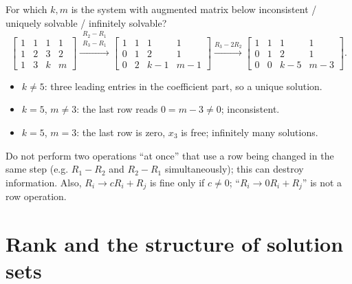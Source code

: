 \begin{example}
For which $k,m$ is the system with augmented matrix below inconsistent / uniquely solvable /
infinitely solvable?
\[
\left[\begin{array}{ccc|c} 1&1&1&1\\ 1&2&3&2\\ 1&3&k&m\end{array}\right]
\xrightarrow{\substack{R_2-R_1\\R_3-R_1}}
\left[\begin{array}{ccc|c} 1&1&1&1\\ 0&1&2&1\\ 0&2&k-1&m-1\end{array}\right]
\xrightarrow{R_3-2R_2}
\left[\begin{array}{ccc|c} 1&1&1&1\\ 0&1&2&1\\ 0&0&k-5&m-3\end{array}\right].
\]
\begin{itemize}
  \item $k\ne5$: three leading entries in the coefficient part, so a unique solution.
  \item $k=5$, $m\ne3$: the last row reads $0=m-3\neq 0$; inconsistent.
  \item $k=5$, $m=3$: the last row is zero, $x_3$ is free; infinitely many solutions.
\end{itemize}
\end{example}

\begin{important}[Pitfall]
Do not perform two operations ``at once'' that use a row being changed in the same step (e.g.
$R_1-R_2$ and $R_2-R_1$ simultaneously); this can destroy information. Also, $R_i\to cR_i+R_j$ is
fine only if $c\ne 0$; ``$R_i \to 0R_i + R_j$'' is not a row operation.
\end{important}

\section{Rank and the structure of solution sets}

